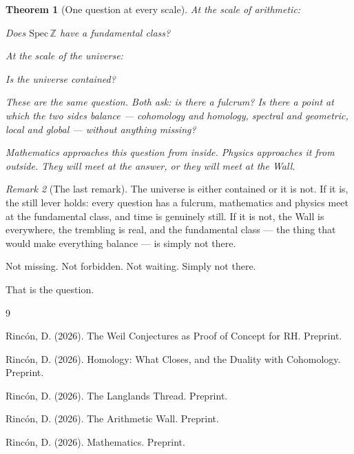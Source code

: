 \documentclass[12pt]{article}
\newtheorem{theorem}{Theorem}
\theoremstyle{definition}
\theoremstyle{remark}
\newtheorem{remark}[theorem]{Remark}
\begin{document}
\begin{theorem}[One question at every scale]
\label{thm:one}
At the scale of arithmetic:
\begin{center}
\emph{Does $\mathrm{Spec}\,\mathbb{Z}$ have a fundamental class?}
\end{center}
At the scale of the universe:
\begin{center}
\emph{Is the universe contained?}
\end{center}
These are the same question.
Both ask: is there a fulcrum?
Is there a point at which the two sides balance ---
cohomology and homology, spectral and geometric,
local and global --- without anything missing?

Mathematics approaches this question from inside.
Physics approaches it from outside.
They will meet at the answer,
or they will meet at the Wall.
\end{theorem}

\begin{remark}[The last remark]
The universe is either contained or it is not.
If it is, the still lever holds: every question has a fulcrum,
mathematics and physics meet at the fundamental class,
and time is genuinely still.
If it is not, the Wall is everywhere,
the trembling is real,
and the fundamental class --- the thing that would make
everything balance --- is simply not there.

Not missing. Not forbidden. Not waiting.
Simply not there.

That is the question.
\end{remark}

\begin{thebibliography}{9}

Rinc\'on, D. (2026).
The Weil Conjectures as Proof of Concept for RH. Preprint.

Rinc\'on, D. (2026).
Homology: What Closes, and the Duality with Cohomology. Preprint.

Rinc\'on, D. (2026).
The Langlands Thread. Preprint.

Rinc\'on, D. (2026).
The Arithmetic Wall. Preprint.

Rinc\'on, D. (2026).
Mathematics. Preprint.

\end{thebibliography}
\end{document}
